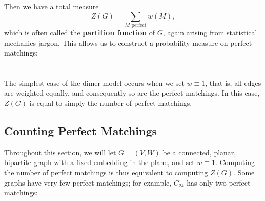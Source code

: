 \documentclass{article}
\begin{document}
	 Then we have a total measure $$Z(G) = \sum_{M \text{ perfect}} w(M),$$ which is often called the \textbf{partition function} of $G$, again arising from statistical mechanics jargon. This allows us to construct a probability measure on perfect matchings: \\
		
		\\ \\

The simplest case of the dimer model occurs when we set $w \equiv 1$, that is, all edges are weighted equally, and consequently so are the perfect matchings. In this case, $Z(G)$ is equal to simply the number of perfect matchings.

	
	
	
	\subsection{Counting Perfect Matchings}
	
	
	Throughout this section, we will let $G=(V,W)$ be a connected, planar, bipartite graph with a fixed embedding in the plane, and set $w \equiv 1$. Computing the number of perfect matchings is thus equivalent to computing $Z(G)$. Some graphs have very few perfect matchings;  for example, $C_{2k}$ has only two perfect matchings: \\
	
\end{document}
